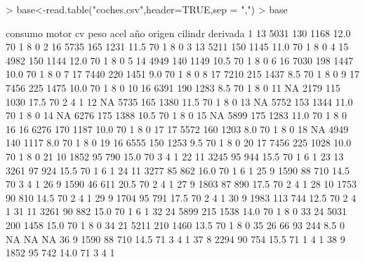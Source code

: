 \documentclass{article}
\begin{document}
\begin{Schunk}
\begin{Sinput}
> base<-read.table("coches.csv",header=TRUE,sep = ",")    
> base
\end{Sinput}
\begin{Soutput}
    consumo motor  cv peso acel año origen cilindr derivada
1        13  5031 130 1168 12.0  70      1       8        0
2        16  5735 165 1231 11.5  70      1       8        0
3        13  5211 150 1145 11.0  70      1       8        0
4        15  4982 150 1144 12.0  70      1       8        0
5        14  4949 140 1149 10.5  70      1       8        0
6        16  7030 198 1447 10.0  70      1       8        0
7        17  7440 220 1451  9.0  70      1       8        0
8        17  7210 215 1437  8.5  70      1       8        0
9        17  7456 225 1475 10.0  70      1       8        0
10       16  6391 190 1283  8.5  70      1       8        0
11       NA  2179 115 1030 17.5  70      2       4        1
12       NA  5735 165 1380 11.5  70      1       8        0
13       NA  5752 153 1344 11.0  70      1       8        0
14       NA  6276 175 1388 10.5  70      1       8        0
15       NA  5899 175 1283 11.0  70      1       8        0
16       16  6276 170 1187 10.0  70      1       8        0
17       17  5572 160 1203  8.0  70      1       8        0
18       NA  4949 140 1117  8.0  70      1       8        0
19       16  6555 150 1253  9.5  70      1       8        0
20       17  7456 225 1028 10.0  70      1       8        0
21       10  1852  95  790 15.0  70      3       4        1
22       11  3245  95  944 15.5  70      1       6        1
23       13  3261  97  924 15.5  70      1       6        1
24       11  3277  85  862 16.0  70      1       6        1
25        9  1590  88  710 14.5  70      3       4        1
26        9  1590  46  611 20.5  70      2       4        1
27        9  1803  87  890 17.5  70      2       4        1
28       10  1753  90  810 14.5  70      2       4        1
29        9  1704  95  791 17.5  70      2       4        1
30        9  1983 113  744 12.5  70      2       4        1
31       11  3261  90  882 15.0  70      1       6        1
32       24  5899 215 1538 14.0  70      1       8        0
33       24  5031 200 1458 15.0  70      1       8        0
34       21  5211 210 1460 13.5  70      1       8        0
35       26    66  93  244  8.5   0     NA      NA       NA
36        9  1590  88  710 14.5  71      3       4        1
37        8  2294  90  754 15.5  71      1       4        1
38        9  1852  95  742 14.0  71      3       4        1

\end{Soutput}
\end{Schunk}
\end{document}
